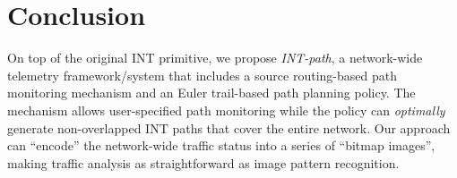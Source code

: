 \section{Conclusion}

On top of the original INT primitive, we propose \emph{INT-path}, a network-wide telemetry framework/system that includes a source routing-based path monitoring mechanism and an Euler trail-based path planning policy. The mechanism allows user-specified path monitoring while the policy can \emph{optimally} generate non-overlapped INT paths that cover the entire network. Our approach can ``encode'' the network-wide traffic status into a series of ``bitmap images'', making traffic analysis as straightforward as image pattern recognition.

